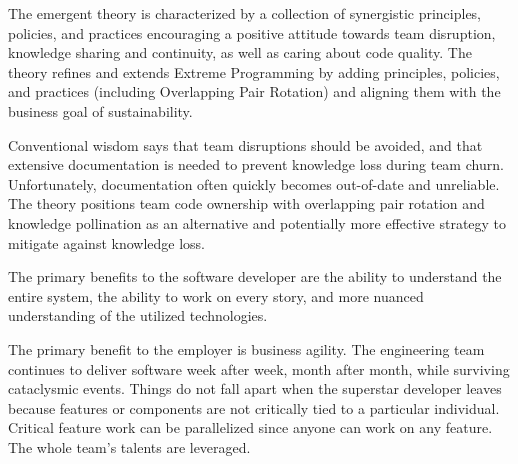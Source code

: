 The emergent theory is characterized by a collection of synergistic principles, policies, and practices encouraging a positive attitude towards team disruption, knowledge sharing and continuity, as well as caring about code quality. The theory refines and extends Extreme Programming by adding principles, policies, and practices (including Overlapping Pair Rotation) and aligning them with the business goal of sustainability.

Conventional wisdom says that team disruptions should be avoided, and that extensive documentation is needed to prevent knowledge loss during team churn. Unfortunately, documentation often quickly becomes out-of-date and unreliable. The theory positions team code ownership with overlapping pair rotation and knowledge pollination as an alternative and potentially more effective strategy to mitigate against knowledge loss.

The primary benefits to the software developer are the ability to understand the entire system, the ability to work on every story, and more nuanced understanding of the utilized technologies. 

The primary benefit to the employer is business agility. The engineering team continues to deliver software week after week, month after month, while surviving cataclysmic events. Things do not fall apart when the superstar developer leaves because features or components are not critically tied to a particular individual. Critical feature work can be parallelized since anyone can work on any feature.  The whole team's talents are leveraged.


